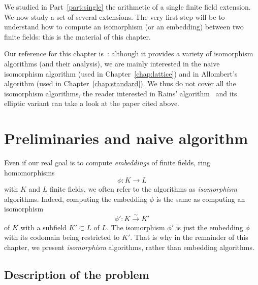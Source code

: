 We studied in Part~\ref{part:single} the arithmetic of a single finite field
extension. We now study a set of several extensions. The very first step will be
to understand how to compute an isomorphism (or an embedding) between two finite
fields: this is the material of this chapter.
\minitoc


\clearpage

Our reference for this chapter is~\cite{BDDFS17}: although it provides a variety
of isomorphism algorithms (and their analysis), we are mainly interested in the
naive isomorphism algorithm (used in
Chapter~\ref{chap:lattice}) and in Allombert's algorithm (used in
Chapter~\ref{chap:standard}). We thus do not cover all the isomorphism
algorithms, the reader interested in Rains' algorithm~\cite{Pinch92, Rains96}
and its elliptic variant can take a look at the paper cited above.

\section{Preliminaries and naive algorithm}

Even if our real goal is to compute \emph{embeddings} of finite fields, \ie
ring homomorphisms
\[
  \phi:K\to L
\]
with $K$ and $L$ finite fields, we often refer to the algorithms as
\emph{isomorphism} algorithms. Indeed, computing the embedding $\phi$ is
the same as computing an isomorphism
\[
  \phi':K\overset{\sim}{\to} K'
\]
of $K$ with a subfield $K'\subset L$ of $L$. The
isomorphism $\phi'$ is just the embedding $\phi$ with its codomain being
restricted to $K'$. That is why in the remainder of this chapter, we present
\emph{isomorphism} algorithms, rather than embedding algorithms.

\subsection{Description of the problem}

